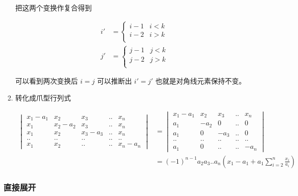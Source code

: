 \documentclass[12pt,a4paper]{ctexart}
\begin{document}
\begin{enumerate}
    把这两个变换作复合得到

    \begin{align*}
        i' &= \begin{cases}
            i-1 & i < k \\
            i - 2 & i > k \\
        \end{cases} \\
        j' &= \begin{cases}
            j - 1& j < k \\
            j - 2 & j > k \\
        \end{cases}
    \end{align*}

    可以看到两次变换后 $i = j$ 可以推断出 $i'=j'$ 也就是对角线元素保持不变。

    \item 转化成爪型行列式

    \begin{align*}
        \begin{vmatrix}
            x_1 - a_1 & x_2 & x_3 & .. & x_n \\
            x_1 & x_2 -a_2 & x_3 & .. & x_n \\
            x_1 & x_2 & x_3 - a_3& .. & x_n \\
            ..& ..&..&..&.. \\
            x_1 & x_2 & .. & .. & x_n -a_n 
        \end{vmatrix} &=         \begin{vmatrix}
            x_1 - a_1 & x_2 & x_3 & .. & x_n \\
            a_1 & -a_2 & 0 & .. & 0 \\
            a_1 & 0 &  - a_3& .. & 0 \\
            ..& ..&..&..&.. \\
            a_1 & 0 & .. & .. &  -a_n 
        \end{vmatrix} \\
        &= (-1)^{n-1}a_2a_3..a_n(x_1 - a_1 + a_1\sum_{i=2}^{n}\frac{x_i}{a_i})
    \end{align*}

\end{enumerate}

\subsubsection{直接展开}
\end{document}
